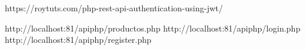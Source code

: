 https://roytuts.com/php-rest-api-authentication-using-jwt/

http://localhost:81/apiphp/productos.php
http://localhost:81/apiphp/login.php
http://localhost:81/apiphp/register.php